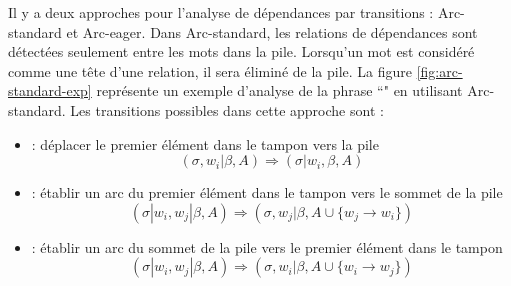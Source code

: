 \documentclass{KodeBook}
\begin{document}
Il y a deux approches pour l'analyse de dépendances par transitions : Arc-standard et Arc-eager. 
Dans Arc-standard, les relations de dépendances sont détectées seulement entre les mots dans la pile. 
Lorsqu'un mot est considéré comme une tête d'une relation, il sera éliminé de la pile. 
La figure \ref{fig:arc-standard-exp} représente un exemple d'analyse de la phrase ``" en utilisant Arc-standard.
Les transitions possibles dans cette approche sont :
\begin{itemize}
	\item {} : déplacer le premier élément dans le tampon vers la pile 
	\[ (\sigma, w_i|\beta, A) \Rightarrow  (\sigma|w_i, \beta, A) \]
	
	\item {} : établir un arc du premier élément dans le tampon vers le sommet de la pile
	\[ (\sigma|w_i, w_j|\beta, A) \Rightarrow  (\sigma, w_j|\beta, A \cup \{w_j \rightarrow w_i \}) \] 
	
	\item {} : établir un arc du sommet de la pile vers le premier élément dans le tampon
	\[ (\sigma|w_i, w_j|\beta, A) \Rightarrow  (\sigma, w_i|\beta, A \cup \{w_i \rightarrow w_j \}) \] 
\end{itemize}
\end{document}
